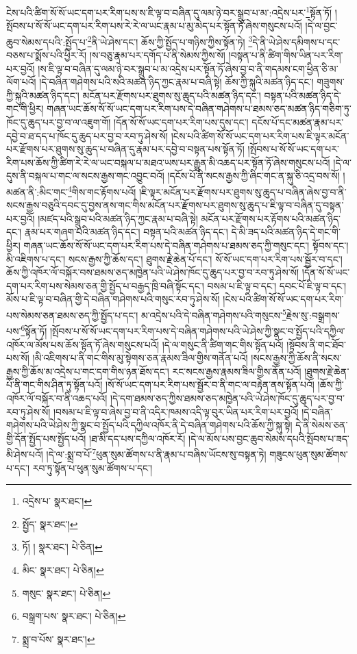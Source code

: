 ངེས་པའི་ཚིག་སོ་སོ་ཡང་དག་པར་རིག་པས་ས་ཇི་ལྟ་བ་བཞིན་དུ་ལམ་ཉེ་བར་སྒྲུབ་པ་མ་:འདྲེས་པར་\footnote{འདྲེས་པ་  སྣར་ཐང་། }སྟོན་ཏོ། །སྤོབས་པ་སོ་སོ་ཡང་དག་པར་རིག་པས་རེ་རེ་ལ་ཡང་རྣམ་པ་མུ་མེད་པར་སྟོན་ཏོ་ཞེས་གསུངས་པའོ། །དེ་ལ་བྱང་ཆུབ་སེམས་དཔའི་:སྤྱོད་པ་\footnote{སྤྱོད་  སྣར་ཐང་། }ནི་ཡེ་ཤེས་དང་། ཆོས་ཀྱི་སྤྱོད་པ་གཉིས་ཀྱིས་སྟོན་ཏེ། \footnote{ཏོ། །   སྣར་ཐང་།  པེ་ཅིན། }དེ་ནི་ཡེ་ཤེས་དམིགས་པ་དང་བཅས་པ་སྨོས་པའི་ཕྱིར་རོ། །ས་བཅུ་རྣམ་པར་དགོད་པ་ནི་སེམས་ཀྱིས་སོ། །བསྟན་པ་ནི་ཚིག་གིས་ཡིན་པར་རིག་པར་བྱའོ། །ས་ཇི་ལྟ་བ་བཞིན་དུ་ལམ་ཉེ་བར་སྒྲུབ་པ་མ་འདྲེས་པར་སྟོན་ཏོ་ཞེས་བྱ་བ་ནི་གདམས་ངག་ཕྱིན་ཅི་མ་ལོག་པའོ། །དེ་བཞིན་གཤེགས་པའི་སའི་མཚན་ཉིད་ཀྱང་རྣམ་པ་བཞི་སྟེ། ཆོས་ཀྱི་སྐུའི་མཚན་ཉིད་དང་། གཟུགས་ཀྱི་སྐུའི་མཚན་ཉིད་དང་། མངོན་པར་རྫོགས་པར་ཐུགས་སུ་ཆུད་པའི་མཚན་ཉིད་དང་། བསྟན་པའི་མཚན་ཉིད་དེ་གང་གི་ཕྱིར། གཞན་ཡང་ཆོས་སོ་སོ་ཡང་དག་པར་རིག་པས་དེ་བཞིན་གཤེགས་པ་ཐམས་ཅད་མཚན་ཉིད་གཅིག་ཏུ་ཁོང་དུ་ཆུད་པར་བྱ་བ་ལ་འཇུག་གོ། །དོན་སོ་སོ་ཡང་དག་པར་རིག་པས་དུས་དང་། དངོས་པོ་དང་མཚན་རྣམ་པར་དབྱེ་བ་ཐ་དད་པ་ཁོང་དུ་ཆུད་པར་བྱ་བ་རབ་ཏུ་ཤེས་སོ། །ངེས་པའི་ཚིག་སོ་སོ་ཡང་དག་པར་རིག་པས་ཇི་ལྟར་མངོན་པར་རྫོགས་པར་ཐུགས་སུ་ཆུད་པ་བཞིན་དུ་རྣམ་པར་དབྱེ་བ་བསྟན་པས་སྟོན་ཏོ། །སྤོབས་པ་སོ་སོ་ཡང་དག་པར་རིག་པས་ཆོས་ཀྱི་ཚིག་རེ་རེ་ལ་ཡང་བསྐལ་པ་མཐའ་ཡས་པར་རྒྱུན་མི་འཆད་པར་སྟོན་ཏོ་ཞེས་གསུངས་པའོ། །དེ་ལ་དུས་ནི་བསྐལ་པ་གང་ལ་སངས་རྒྱས་གང་འབྱུང་བའོ། །དངོས་པོ་ནི་སངས་རྒྱས་ཀྱི་ཞིང་གང་ན་སྐུ་ཅི་འདྲ་བས་སོ། །མཚན་ནི་:མིང་གང་\footnote{མིང་  སྣར་ཐང་།  པེ་ཅིན། }གིས་གང་རྟོགས་པའོ། །ཇི་ལྟར་མངོན་པར་རྫོགས་པར་ཐུགས་སུ་ཆུད་པ་བཞིན་ཞེས་བྱ་བ་ནི་སངས་རྒྱས་བཅུའི་དབང་དུ་བྱས་ནས་གང་གིས་མངོན་པར་རྫོགས་པར་ཐུགས་སུ་ཆུད་པ་ཇི་ལྟ་བ་བཞིན་དུ་བསྟན་པར་བྱའོ། །མཛད་པའི་སྒྲུབ་པའི་མཚན་ཉིད་ཀྱང་རྣམ་པ་བཞི་སྟེ། མངོན་པར་རྫོགས་པར་རྟོགས་པའི་མཚན་ཉིད་དང་། རྣམ་པར་གཞག་པའི་མཚན་ཉིད་དང་། བསྟན་པའི་མཚན་ཉིད་དང་། དེ་མི་ཟད་པའི་མཚན་ཉིད་དེ་གང་གི་ཕྱིར། གཞན་ཡང་ཆོས་སོ་སོ་ཡང་དག་པར་རིག་པས་དེ་བཞིན་གཤེགས་པ་ཐམས་ཅད་ཀྱི་གསུང་དང་། སྟོབས་དང་། མི་འཇིགས་པ་དང་། སངས་རྒྱས་ཀྱི་ཆོས་དང་། ཐུགས་རྗེ་ཆེན་པོ་དང་། སོ་སོ་ཡང་དག་པར་རིག་པས་སྦྱོར་བ་དང་། ཆོས་ཀྱི་འཁོར་ལོ་བསྐོར་བས་ཐམས་ཅད་མཁྱེན་པའི་ཡེ་ཤེས་ཁོང་དུ་ཆུད་པར་བྱ་བ་རབ་ཏུ་ཤེས་སོ། །དོན་སོ་སོ་ཡང་དག་པར་རིག་པས་སེམས་ཅན་གྱི་སྤྱོད་པ་བརྒྱད་ཁྲི་བཞི་སྟོང་དང་། བསམ་པ་ཇི་ལྟ་བ་དང་། དབང་པོ་ཇི་ལྟ་བ་དང་། མོས་པ་ཇི་ལྟ་བ་བཞིན་གྱི་དེ་བཞིན་གཤེགས་པའི་གསུང་རབ་ཏུ་ཤེས་སོ། །ངེས་པའི་ཚིག་སོ་སོ་ཡང་དག་པར་རིག་པས་སེམས་ཅན་ཐམས་ཅད་ཀྱི་སྤྱོད་པ་དང་། མ་འདྲེས་པའི་དེ་བཞིན་གཤེགས་པའི་གསུངས་\footnote{གསུང་  སྣར་ཐང་།  པེ་ཅིན། }རྗེས་སུ་:བསྒྲགས་པས་\footnote{བསྒྲག་པས་  སྣར་ཐང་།  པེ་ཅིན། }སྟོན་ཏོ། །སྤོབས་པ་སོ་སོ་ཡང་དག་པར་རིག་པས་དེ་བཞིན་གཤེགས་པའི་ཡེ་ཤེས་ཀྱི་སྣང་བ་སྤྱོད་པའི་དཀྱིལ་འཁོར་ལ་མོས་པས་ཆོས་སྟོན་ཏོ་ཞེས་གསུངས་པའོ། །དེ་ལ་གསུང་ནི་ཚིག་གང་གིས་སྟོན་པའོ། །སྟོབས་ནི་གང་ཐོབ་པས་སོ། །མི་འཇིགས་པ་ནི་གང་གིས་མུ་སྟེགས་ཅན་རྣམས་ཟིལ་གྱིས་གནོན་པའོ། །སངས་རྒྱས་ཀྱི་ཆོས་ནི་སངས་རྒྱས་ཀྱི་ཆོས་མ་འདྲེས་པ་གང་དག་གིས་ཉན་ཐོས་དང་། རང་སངས་རྒྱས་རྣམས་ཟིལ་གྱིས་ནོན་པའོ། །ཐུགས་རྗེ་ཆེན་པོ་ནི་གང་གིས་ཤིན་ཏུ་སྟོན་པའོ། །སོ་སོ་ཡང་དག་པར་རིག་པས་སྦྱོར་བ་ནི་གང་ལ་བརྟེན་ནས་སྟོན་པའོ། །ཆོས་ཀྱི་འཁོར་ལོ་བསྐོར་བ་ནི་འཆད་པའོ། །དེ་དག་ཐམས་ཅད་ཀྱིས་ཐམས་ཅད་མཁྱེན་པའི་ཡེ་ཤེས་ཁོང་དུ་ཆུད་པར་བྱ་བ་རབ་ཏུ་ཤེས་སོ། །བསམ་པ་ཇི་ལྟ་བ་ཞེས་བྱ་བ་ནི་འདིར་ཁམས་འདི་ལྟ་བུར་ཡིན་པར་རིག་པར་བྱའོ། །དེ་བཞིན་གཤེགས་པའི་ཡེ་ཤེས་ཀྱི་སྣང་བ་སྤྱོད་པའི་དཀྱིལ་འཁོར་ནི་དེ་བཞིན་གཤེགས་པའི་ཆོས་ཀྱི་སྐུ་སྟེ། དེ་ནི་སེམས་ཅན་གྱི་དོན་སྤྱོད་པས་སྤྱོད་པའོ། །ཐ་མི་དད་པས་དཀྱིལ་འཁོར་རོ། །དེ་ལ་མོས་པས་བྱང་ཆུབ་སེམས་དཔའི་སྤོབས་པ་ཟད་མི་ཤེས་པའོ། །དེ་ལ་:སྨྲ་བ་པོ་\footnote{སྨྲ་བ་པོས་  སྣར་ཐང་། }ཕུན་སུམ་ཚོགས་པ་ནི་རྣམ་པ་བཞིས་ཡོངས་སུ་བསྟན་ཏེ། གཟུངས་ཕུན་སུམ་ཚོགས་པ་དང་། རབ་ཏུ་སྟོན་པ་ཕུན་སུམ་ཚོགས་པ་དང་། 
